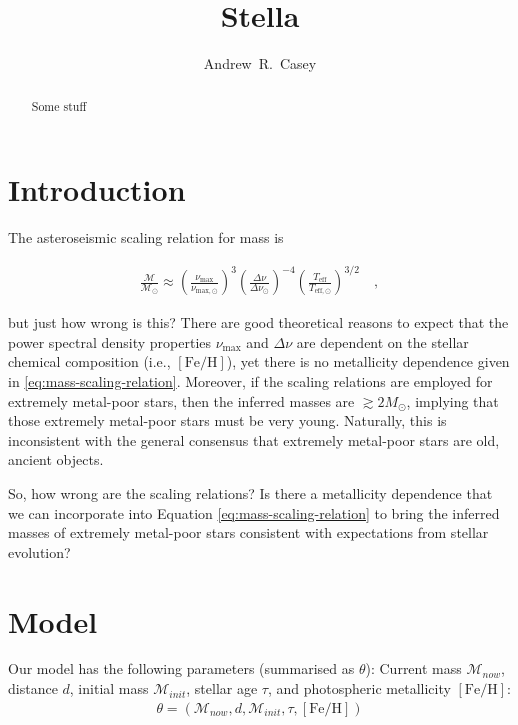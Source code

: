 \documentclass[preprint]{aastex}
\newcommand{\teff}{T_{\mathrm{eff}}}
\newcommand{\teffSolar}{T_{\mathrm{eff},\odot}}
\newcommand{\feh}{[\mathrm{Fe/H}]}
\newcommand{\mass}{\mathcal{M}}
\newcommand{\massSolar}{\mass_\odot}
\newcommand{\numax}{\nu_\mathrm{max}}
\newcommand{\numaxSolar}{\nu_{\mathrm{max},\odot}}
\newcommand{\deltanu}{\Delta\nu}
\newcommand{\deltanuSolar}{\deltanu_\odot}
\newcommand{\age}{\tau}
\begin{document}
\title{Stella}

\author{
  Andrew~R.~Casey
}


\begin{abstract}
  Some stuff
\end{abstract}


\keywords{stars: fundamental parameters --- stars: abundances
}

\section{Introduction} 
\label{sec:introduction}


The asteroseismic scaling relation for mass is

\begin{eqnarray}\label{eq:mass-scaling-relation}
    \frac{\mass}{\massSolar} \approx \left(\frac{\numax}{\numaxSolar}\right)^{3}\left(\frac{\deltanu}{\deltanuSolar}\right)^{-4}\left(\frac{\teff}{\teffSolar}\right)^{3/2}  \quad ,
\end{eqnarray}

\noindent{}but just how wrong is this? There are good theoretical reasons to expect that the power spectral density properties $\numax$ and $\deltanu$ are dependent on the stellar chemical composition (i.e., $\feh$), yet there is no metallicity dependence given in \ref{eq:mass-scaling-relation}.  Moreover, if the scaling relations are employed for extremely metal-poor stars, then the inferred masses are $\gtrsim2M_\odot$, implying that those extremely metal-poor stars must be very young. Naturally, this is inconsistent with the general consensus that extremely metal-poor stars are old, ancient objects.

So, how wrong are the scaling relations? Is there a metallicity dependence that we can incorporate into Equation \ref{eq:mass-scaling-relation} to bring the inferred masses of extremely metal-poor stars consistent with expectations from stellar evolution? 

\section{Model}
\label{sec:model}


Our model has the following parameters (summarised as $\theta$): Current mass $\mass_{now}$, distance $d$, initial mass $\mass_{init}$, stellar age $\age$, and photospheric metallicity $\feh$:
\begin{eqnarray}\label{eq:model-parameters}
    \theta = (\mass_{now}, d, \mass_{init}, \tau, \feh)
\end{eqnarray}
\end{document}
